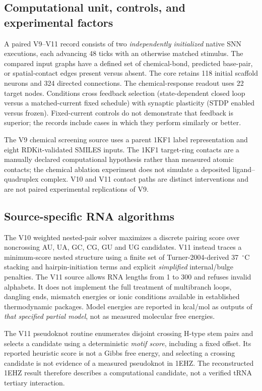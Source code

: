 \documentclass[11pt,a4paper]{article}
\begin{document}
\subsection{Computational unit, controls, and experimental factors}
A paired V9--V11 record consists of two \emph{independently initialized} native SNN executions, each advancing 48 ticks with an otherwise matched stimulus. The compared input graphs have a defined set of chemical-bond, predicted base-pair, or spatial-contact edges present versus absent. The core retains 118 initial scaffold neurons and 324 directed connections. The chemical-response readout uses 22 target nodes. Conditions cross feedback selection (state-dependent closed loop versus a matched-current fixed schedule) with synaptic plasticity (STDP enabled versus frozen). Fixed-current controls do not demonstrate that feedback is superior; the records include cases in which they perform similarly or better.

The V9 chemical screening source uses a parent 1KF1 label representation and eight RDKit-validated SMILES inputs. The 1KF1 target-ring contacts are a manually declared computational hypothesis rather than measured atomic contacts; the chemical ablation experiment does not simulate a deposited ligand--quadruplex complex. V10 and V11 contact paths are distinct interventions and are not paired experimental replications of V9.

\subsection{Source-specific RNA algorithms}
The V10 weighted nested-pair solver maximizes a discrete pairing score over noncrossing AU, UA, GC, CG, GU and UG candidates. V11 instead traces a minimum-score nested structure using a finite set of Turner-2004-derived 37~$^\circ$C stacking and hairpin-initiation terms and explicit \emph{simplified} internal/bulge penalties. The V11 source allows RNA lengths from 1 to 300 and refuses invalid alphabets. It does not implement the full treatment of multibranch loops, dangling ends, mismatch energies or ionic conditions available in established thermodynamic packages. Model energies are reported in kcal/mol as outputs of \emph{that specified partial model}, not as measured molecular free energies.

The V11 pseudoknot routine enumerates disjoint crossing H-type stem pairs and selects a candidate using a deterministic \emph{motif score}, including a fixed offset. Its reported heuristic score is not a Gibbs free energy, and selecting a crossing candidate is not evidence of a measured pseudoknot in 1EHZ. The reconstructed 1EHZ result therefore describes a computational candidate, not a verified tRNA tertiary interaction.
\end{document}
